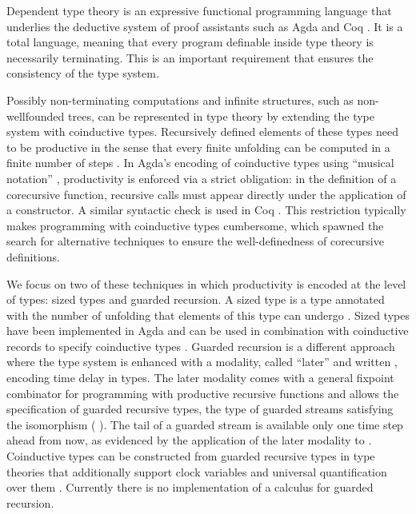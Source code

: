 Dependent type theory is an expressive functional programming
language that underlies the deductive system of proof assistants such
as Agda and Coq \cite{barras1997coq,norell}. It is a total language,
meaning that every program definable inside type theory is necessarily
terminating. This is an important requirement that ensures the
consistency of the type system. 

Possibly non-terminating computations
and infinite structures, such as non-wellfounded trees, can be
represented in type theory by extending the type system with
coinductive types. Recursively defined elements of these types
need to be productive in the sense that every
finite unfolding can be computed in a finite number of steps \cite{Coquand93}.
In Agda's encoding of coinductive types using ``musical notation''
\cite{DA10}, productivity is enforced via a strict obligation: in the
definition of a corecursive function, recursive
calls must appear directly under
the application of a constructor. A similar syntactic
check is used in Coq \cite{DBertotK08}.
This restriction
typically makes programming with coinductive types cumbersome,
which spawned the search for alternative techniques to ensure the
well-definedness of corecursive definitions.

We focus on two of these techniques in which productivity is encoded
at the level of types: sized types and guarded recursion. A sized type
 is a type annotated with the number of unfolding that
elements of this type can undergo \cite{Hughes96}. Sized types have been implemented
in Agda and can be used in
combination with coinductive records to specify
coinductive types \cite{Copatterns,AVW-normalization}.  Guarded recursion \cite{Nakano}
is a different approach where the type system is enhanced with a
modality, called ``later'' and written , encoding time delay in
types. The later modality comes with a general fixpoint combinator for
programming with productive recursive functions and allows the
specification of guarded recursive types, \eg the type of guarded
streams satisfying the isomorphism     
 ( ). The tail of a guarded stream is available only
one time step ahead from now, as evidenced by the application of the
later modality to  . Coinductive types can be constructed
from guarded recursive types in type theories that additionally
support clock variables and universal quantification over them
\cite{atkey2013productive,BahrGM17}. Currently there is no
implementation of a calculus for guarded recursion.

